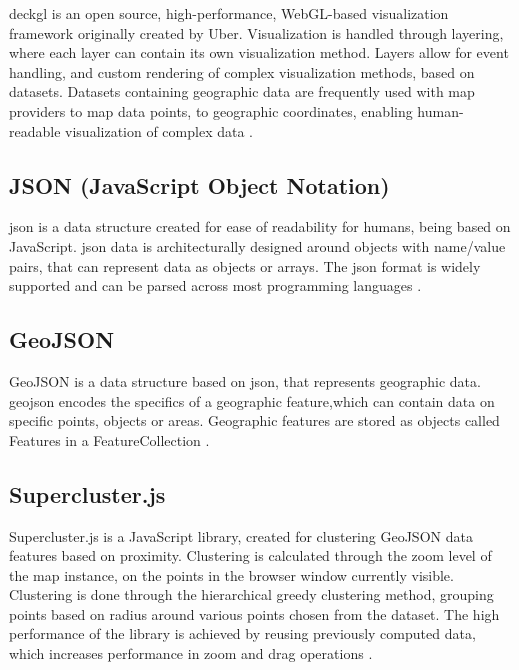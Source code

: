 \gls{deckgl} is an open source, high-performance, WebGL-based visualization framework originally created by Uber. Visualization is handled through layering, where each layer can contain its own visualization method. Layers allow for event handling, and custom rendering of complex visualization methods, based on datasets. Datasets containing geographic data are frequently used with map providers to map data points, to geographic coordinates, enabling human-readable visualization of complex data \parencite{deckgl_carto,deckgl_learning_resources,deckgl_official_site,google_deckgl_overlay}.

\subsection{JSON (JavaScript Object Notation)}
\label{sec:JSON_theory}

\acrfull{json} is a data structure created for ease of readability for humans, being based on JavaScript. \acrshort{json} data is architecturally designed around objects with name/value pairs, that can represent data as objects or arrays. The \acrshort{json} format is widely supported and can be parsed across most programming languages \parencite{json_official_site}.

\subsection{GeoJSON}
\label{sec:geoJSON}

GeoJSON is a data structure based on \acrshort{json}, that represents geographic data. \acrshort{geojson} encodes the specifics of a geographic feature,which can contain data on specific points, objects or areas. Geographic features are stored as objects called Features in a FeatureCollection \parencite{geojson_datatracker}.

\subsection{Supercluster.js}
\label{sec:supercluster}
Supercluster.js is a JavaScript library, created for clustering GeoJSON data features based on proximity. Clustering is calculated through the zoom level of the map instance, on the points in the browser window currently visible. Clustering is done through the hierarchical greedy clustering method, grouping points based on radius around various points chosen from the dataset. The high performance of the library is achieved by reusing previously computed data, which increases performance in zoom and drag operations \parencite{mapbox_supercluster_github,mapbox_supercluster_blog}.


